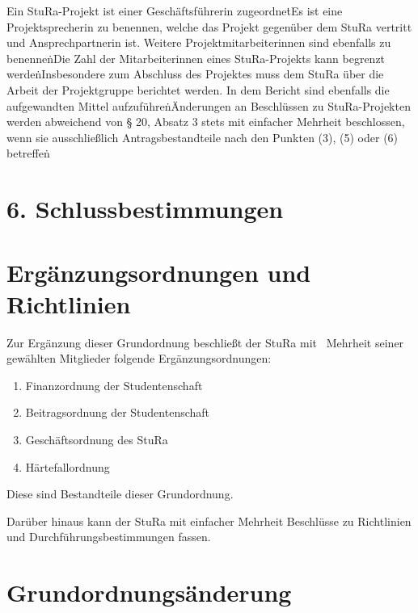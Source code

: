 \begin{multicols}{2}
\Abs \Satz Ein StuRa-Projekt ist einer Geschäftsführerin zugeordnet\.

\Abs \Satz Es ist eine Projektsprecherin zu benennen, welche das Projekt gegenüber dem StuRa vertritt und Ansprechpartnerin ist. Weitere Projektmitarbeiterinnen sind ebenfalls zu benennen\.

\Abs \Satz Die Zahl der Mitarbeiterinnen eines StuRa-Projekts kann begrenzt werden\.

\Abs \Satz Insbesondere zum Abschluss des Projektes muss dem StuRa über die Arbeit der Projektgruppe berichtet werden. In dem Bericht sind ebenfalls die aufgewandten Mittel aufzuführen\.

\Abs \Satz Änderungen an Beschlüssen zu StuRa-Projekten werden abweichend von § 20, Absatz 3 stets mit einfacher Mehrheit beschlossen, wenn sie ausschließlich Antragsbestandteile nach den Punkten (3), (5) oder (6) betreffen\.


\setcounter{section}{28}


\section*{6. Schlussbestimmungen}



\section{Ergänzungsordnungen und Richtlinien}

\Abs \Satz Zur Ergänzung dieser Grundordnung beschließt der StuRa mit ~Mehrheit seiner gewählten Mitglieder folgende Ergänzungsordnungen:
\begin{enumerate}
\item Finanzordnung der Studentenschaft
\item Beitragsordnung der Studentenschaft
\item Geschäftsordnung des StuRa
\item Härtefallordnung
\end{enumerate}

\Abs \Satz Diese sind Bestandteile dieser Grundordnung.

\Abs \Satz Darüber hinaus kann der StuRa mit einfacher Mehrheit Beschlüsse zu Richtlinien und Durchführungsbestimmungen fassen.



\section{Grundordnungsänderung}


\end{multicols}
